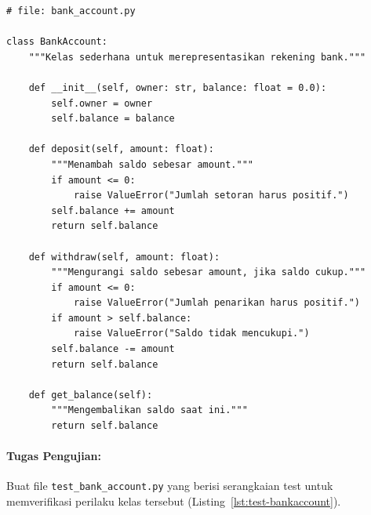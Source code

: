 \begin{lstlisting}[style=PythonStyle, caption={Kelas BankAccount yang memiliki state internal}, label={lst:bankaccount}]
# file: bank_account.py

class BankAccount:
    """Kelas sederhana untuk merepresentasikan rekening bank."""

    def __init__(self, owner: str, balance: float = 0.0):
        self.owner = owner
        self.balance = balance

    def deposit(self, amount: float):
        """Menambah saldo sebesar amount."""
        if amount <= 0:
            raise ValueError("Jumlah setoran harus positif.")
        self.balance += amount
        return self.balance

    def withdraw(self, amount: float):
        """Mengurangi saldo sebesar amount, jika saldo cukup."""
        if amount <= 0:
            raise ValueError("Jumlah penarikan harus positif.")
        if amount > self.balance:
            raise ValueError("Saldo tidak mencukupi.")
        self.balance -= amount
        return self.balance

    def get_balance(self):
        """Mengembalikan saldo saat ini."""
        return self.balance
\end{lstlisting}

\paragraph{Tugas Pengujian:}

Buat file \texttt{test\_bank\_account.py} yang berisi serangkaian test untuk memverifikasi perilaku kelas tersebut (Listing~\ref{lst:test-bankaccount}).

